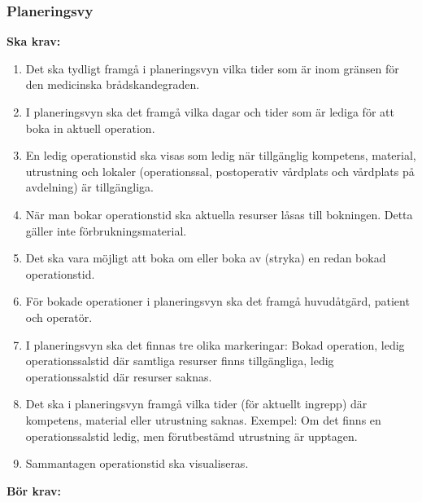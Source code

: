 \documentclass{article}
\begin{document}
\subsubsection{Planeringsvy}
\textbf{Ska krav: }
\begin{enumerate}
\item Det ska tydligt framgå i planeringsvyn vilka tider som är inom gränsen
för den medicinska brådskandegraden.
\item I planeringsvyn ska det framgå vilka dagar och tider som är lediga för
att boka in aktuell operation.
\item En ledig operationstid ska visas som ledig när tillgänglig kompetens,
material, utrustning och lokaler (operationssal, postoperativ vårdplats och
vårdplats på avdelning) är tillgängliga.
\item När man bokar operationstid ska aktuella resurser låsas till bokningen.
Detta gäller inte förbrukningsmaterial.
\item Det ska vara möjligt att boka om eller boka av (stryka) en redan bokad
operationstid.
\item För bokade operationer i planeringsvyn ska det framgå huvudåtgärd,
patient och operatör.
\item I planeringsvyn ska det finnas tre olika markeringar: Bokad operation,
ledig operationssalstid där samtliga resurser finns tillgängliga, ledig
operationssalstid där resurser saknas.
\item Det ska i planeringsvyn framgå vilka tider (för aktuellt ingrepp) där
kompetens, material eller utrustning saknas.
Exempel: Om det finns en operationssalstid ledig, men förutbestämd utrustning
är upptagen.
\item Sammantagen operationstid ska visualiseras.
\end{enumerate}
\textbf{Bör krav: }
\end{document}
